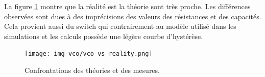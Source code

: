 La figure \ref{fig:theory_vs_mesure} montre que la réalité est la théorie sont très proche.
Les différences observées sont dues à des imprécisions des valeurs des résistances et des 
capacités. Cela provient aussi du switch qui contrairement au modèle utilisé dans les 
simulations et les calculs possède une légère courbe d'hystérèse.
\begin{figure}
	\centering
	\texttt{[image: img-vco/vco\_vs\_reality.png]}
	\caption{Confrontations des théories et des mesures.}
	\label{fig:theory_vs_mesure}
\end{figure}
